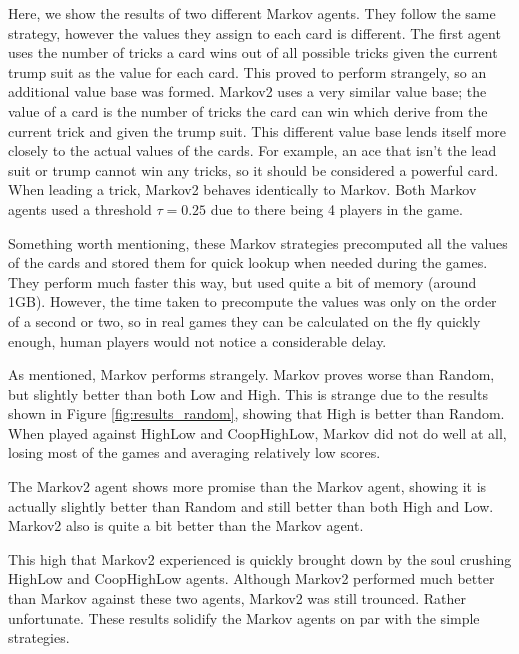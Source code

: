 Here, we show the results of two different Markov agents. They follow the same strategy, however the values they assign to each card
is different. The first agent uses the number of tricks a card wins out of all possible tricks given the current trump suit as the value for
each card. This proved to perform strangely, so an additional value base was formed. Markov2 uses a very similar value base; the value of
a card is the number of tricks the card can win which derive from the current trick and given the trump suit. This different value
base lends itself more closely to the actual values of the cards. For example, an ace that isn't the lead suit or trump cannot win any tricks,
so it should be considered a powerful card. When leading a trick, Markov2 behaves identically to Markov. Both Markov agents used a threshold
$\tau=0.25$ due to there being 4 players in the game.

Something worth mentioning, these Markov strategies precomputed all the values of the cards and stored them for quick lookup when needed during
the games. They perform much faster this way, but used quite a bit of memory (around 1GB). However, the time taken to precompute the values
was only on the order of a second or two, so in real games they can be calculated on the fly quickly enough, human players would not notice
a considerable delay.

As mentioned, Markov performs strangely. Markov proves worse than Random, but slightly better than both Low and High. This is strange due to
the results shown in Figure \ref{fig:results_random}, showing that High is better than Random. When played against HighLow and CoopHighLow, Markov
did not do well at all, losing most of the games and averaging relatively low scores.

The Markov2 agent shows more promise than the Markov agent, showing it is actually slightly better than Random and still better
than both High and Low. Markov2 also is quite a bit better than the Markov agent.

This high that Markov2 experienced is quickly brought down by the soul crushing HighLow and CoopHighLow agents. Although Markov2
performed much better than Markov against these two agents, Markov2 was still trounced. Rather unfortunate. These results solidify
the Markov agents on par with the simple strategies.

